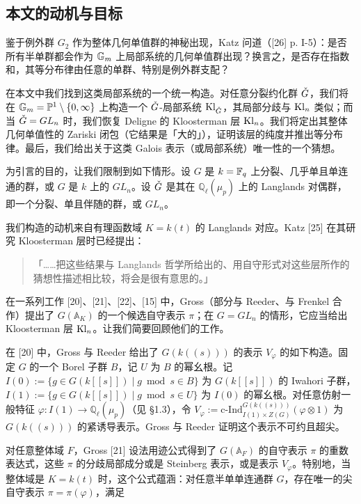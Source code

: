 \subsection{本文的动机与目标}

鉴于例外群 $G_2$ 作为整体几何单值群的神秘出现，Katz 问道（[26] p. I-5）：是否所有半单群都会作为 $\mathbb{G}_m$ 上局部系统的几何单值群出现？换言之，是否存在指数和，其等分布律由任意的单群、特别是例外群支配？

在本文中我们找到这类局部系统的一个统一构造。对任意分裂约化群 $\check G$，我们将在 $\mathbb{G}_m=\mathbb{P}^1\setminus\{0,\infty\}$ 上构造一个 $\check G$-局部系统 $\mathrm{Kl}_{\check G}$，其局部分歧与 $\mathrm{Kl}_n$ 类似；而当 $\check G=GL_n$ 时，我们恢复 Deligne 的 Kloosterman 层 $\mathrm{Kl}_n$。我们将定出其整体几何单值性的 Zariski 闭包（它结果是「大的」），证明该层的纯度并推出等分布律。最后，我们给出关于这类 Galois 表示（或局部系统）唯一性的一个猜想。

为引言的目的，让我们限制到如下情形。设 $G$ 是 $k=\mathbb{F}_q$ 上分裂、几乎单且单连通的群，或 $G$ 是 $k$ 上的 $GL_n$。设 $\check G$ 是其在 $\mathbb{Q}_\ell(\mu_p)$ 上的 Langlands 对偶群，即一个分裂、单且伴随的群，或 $GL_n$。

我们构造的动机来自有理函数域 $K=k(t)$ 的 Langlands 对应。Katz [25] 在其研究 Kloosterman 层时已经提出：

\begin{quote}
「……把这些结果与 Langlands 哲学所给出的、用自守形式对这些层所作的猜想性描述相比较，将会是很有意思的。」
\end{quote}

在一系列工作 [20]、[21]、[22]、[15] 中，Gross（部分与 Reeder、与 Frenkel 合作）提出了 $G(\mathbb{A}_K)$ 的一个候选自守表示 $\pi$；在 $G=GL_n$ 的情形，它应当给出 Kloosterman 层 $\mathrm{Kl}_n$。让我们简要回顾他们的工作。

在 [20] 中，Gross 与 Reeder 给出了 $G(k((s)))$ 的表示 $V_\varphi$ 的如下构造。固定 $G$ 的一个 Borel 子群 $B$，记 $U$ 为 $B$ 的幂幺根。记 $I(0):=\{g\in G(k[[s]])\mid g\bmod s\in B\}$ 为 $G(k[[s]])$ 的 Iwahori 子群，$I(1):=\{g\in G(k[[s]])\mid g\bmod s\in U\}$ 为 $I(0)$ 的幂幺根。对任意仿射一般特征 $\varphi:I(1)\to\mathbb{Q}_\ell(\mu_p)$（见 §1.3），令 $V_\varphi:=\mathrm{c\text{-}Ind}_{I(1)\times Z(G)}^{G(k((s)))}(\varphi\otimes 1)$ 为 $G(k((s)))$ 的紧诱导表示。Gross 与 Reeder 证明这个表示不可约且超尖。

对任意整体域 $F$，Gross [21] 设法用迹公式得到了 $G(\mathbb{A}_F)$ 的自守表示 $\pi$ 的重数表达式，这些 $\pi$ 的分歧局部成分或是 Steinberg 表示，或是表示 $V_\varphi$。特别地，当整体域是 $K=k(t)$ 时，这个公式蕴涵：对任意半单单连通群 $G$，存在唯一的尖自守表示 $\pi=\pi(\varphi)$，满足

